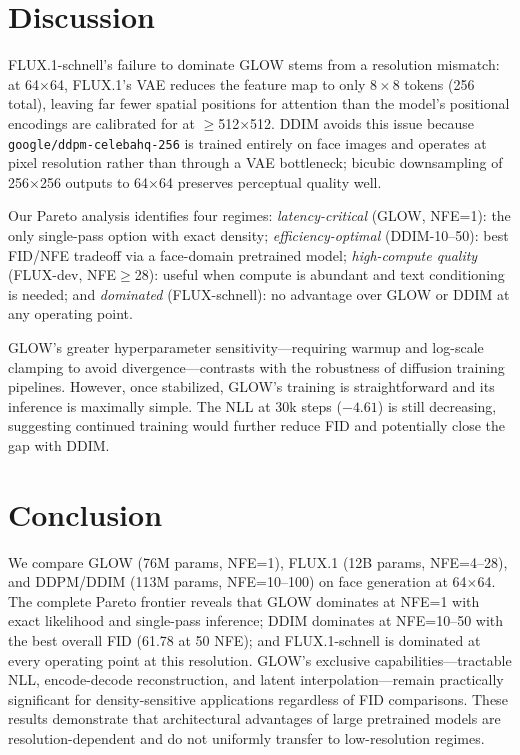 \documentclass[10pt,twocolumn]{article}
\begin{document}
\section{Discussion}
FLUX.1-schnell's failure to dominate GLOW stems from a resolution mismatch: at 64$\times$64, FLUX.1's VAE reduces the feature map to only $8\!\times\!8$ tokens (256 total), leaving far fewer spatial positions for attention than the model's positional encodings are calibrated for at $\geq$512$\times$512. DDIM avoids this issue because \texttt{google/ddpm-celebahq-256} is trained entirely on face images and operates at pixel resolution rather than through a VAE bottleneck; bicubic downsampling of 256$\times$256 outputs to 64$\times$64 preserves perceptual quality well.

Our Pareto analysis identifies four regimes: \textit{latency-critical} (GLOW, NFE=1): the only single-pass option with exact density; \textit{efficiency-optimal} (DDIM-10--50): best FID/NFE tradeoff via a face-domain pretrained model; \textit{high-compute quality} (FLUX-dev, NFE$\geq$28): useful when compute is abundant and text conditioning is needed; and \textit{dominated} (FLUX-schnell): no advantage over GLOW or DDIM at any operating point.

GLOW's greater hyperparameter sensitivity---requiring warmup and log-scale clamping to avoid divergence---contrasts with the robustness of diffusion training pipelines. However, once stabilized, GLOW's training is straightforward and its inference is maximally simple. The NLL at 30k steps ($-4.61$) is still decreasing, suggesting continued training would further reduce FID and potentially close the gap with DDIM.

\section{Conclusion}
We compare GLOW (76M params, NFE=1), FLUX.1 (12B params, NFE=4--28), and DDPM/DDIM (113M params, NFE=10--100) on face generation at 64$\times$64. The complete Pareto frontier reveals that GLOW dominates at NFE=1 with exact likelihood and single-pass inference; DDIM dominates at NFE=10--50 with the best overall FID (61.78 at 50 NFE); and FLUX.1-schnell is dominated at every operating point at this resolution. GLOW's exclusive capabilities---tractable NLL, encode-decode reconstruction, and latent interpolation---remain practically significant for density-sensitive applications regardless of FID comparisons. These results demonstrate that architectural advantages of large pretrained models are resolution-dependent and do not uniformly transfer to low-resolution regimes.
\end{document}
